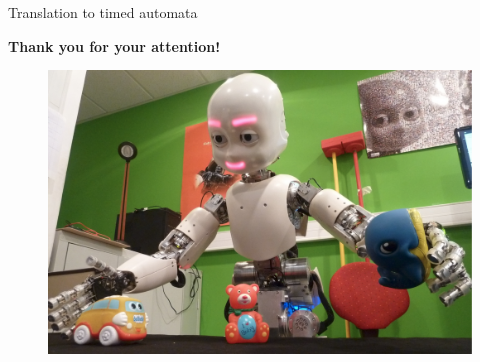 \documentclass[usenames,dvipsnames,xcolor=table]{beamer}
\begin{document}

\begin{frame}{Translation to timed automata}
\begin{center}

\begin{figure}
	\def\svgwidth{1.1\linewidth}
	{
	
	}
\end{figure}

\end{center}
\end{frame}


\begin{frame}{}
\begin{center}
\textbf{\large Thank you for your attention!}
\begin{figure}
\includegraphics[width=0.8\linewidth]{icub.png}
\end{figure}
\end{center}
\end{frame}

\end{document}
